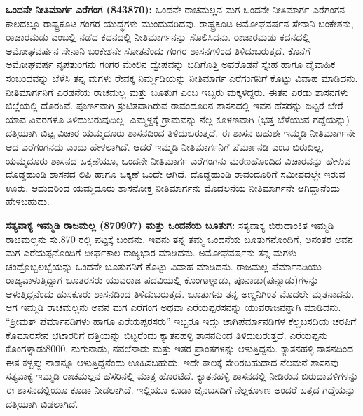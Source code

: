 \textbf{ಒಂದನೇ ನೀತಿಮಾರ್ಗ ಎರೆಗಂಗ (843870):} ಒಂದನೇ ರಾಚಮಲ್ಲನ ಮಗ ಒಂದನೇ ನೀತಿಮಾರ್ಗ ಎರೆಗಂಗನ ಕಾಲದಲ್ಲೂ ರಾಷ್ಟ್ರಕೂಟ ಗಂಗರ ಯುದ್ಧಗಳು ಮುಂದುವರಿದವು. ರಾಷ್ಟ್ರಕೂಟ ಅಮೋಘವರ್ಷನ ಸೇನಾನಿ ಬಂಕೇಶನು, ರಾಜಾರಮಡು ಎಂಬಲ್ಲಿ ನಡೆದ ಕದನದಲ್ಲಿ ನೀತಿಮಾರ್ಗನನ್ನು ಸೊಲಿಸಿದನು. ರಾಜಾರಮಡು ಕದನದಲ್ಲಿ ಅಮೋಘವರ್ಷನ ಸೇನಾನಿ ಬಂಕೇಶನೇ ಸೋತನೆಂದು ಗಂಗರ ಶಾಸನಗಳಿಂದ ತಿಳಿದುಬರುತ್ತದೆ. ಕೊನೆಗೆ ಅಮೋಘವರ್ಷ ನೃಪತುಂಗನು ಗಂಗರ ಮೇಲಿನ ದ್ವೇಷವನ್ನು ಬದಿಗೊತ್ತಿ ಅವರೊಡನೆ ಸ್ನೇಹ ಹಾಗೂ ವೈವಾಹಿಕ ಸಂಬಂಧವನ್ನು ಬೆಳೆಸಿ ತನ್ನ ಮಗಳು ರೇವಕ್ಕ ನಿರ್ಮ್ಮಡಿಯನ್ನು ನೀತಿಮಾರ್ಗ ಎರೆಗಂಗನಿಗೆ ಕೊಟ್ಟು ವಿವಾಹ ಮಾಡಿದನು. ನೀತಿಮಾರ್ಗನಿಗೆ ಎರಡನೆಯ ರಾಚಮಲ್ಲ ಮತ್ತು ಬೂತುಗ ಎಂಬ ಇಬ್ಬರು ಮಕ್ಕಳಿದ್ದರು. ಈತನ ಎರಡು ಶಾಸನಗಳು ಜಿಲ್ಲೆಯಲ್ಲಿ ದೊರಕಿವೆ. ಪೂರ್ಣವಾಗಿ ತ್ರುಟಿತವಾಗಿರುವ ರಾವಂದೂರಿನ ಶಾಸನದಲ್ಲಿ ಇವನ ಹೆಸರನ್ನು ಬಿಟ್ಟರೆ ಬೇರೆ ಯಾವ ವಿವರಗಳೂ ತಿಳಿದುಬರುವುದಿಲ್ಲ. ಎಮ್ಮಳ್ದಕ್ಕೆ ಗ್ರಾಮವನ್ನು ನೆಲ್ಲ ಕೂಳಣವಾಗಿ (ಭತ್ತ ಬೆಳೆಯುವ ಗದ್ದೆಯನ್ನು) ದತ್ತಿಯಾಗಿ ಬಿಟ್ಟ ವಿಚಾರ ಯಮ್ಮದೂರು ಶಾಸನದಿಂದ ತಿಳಿದುಬರುತ್ತದೆ.  ಈ ಶಾಸನ ಬಹುಶಃ ಇಮ್ಮಡಿ ನೀತಿಮಾರ್ಗನೇ ಆದ ಎರೆಗಂಗನದು ಎಂದು ಹೇಳಲಾಗಿದೆ. ಆದರೆ ಇಮ್ಮಡಿ ನೀತಿಮಾರ್ಗನಿಗೆ ಪೆರ್ಮಾನಡಿ ಎಂಬ ಬಿರುದಿಲ್ಲ. ಯಮ್ಮದೂರು ಶಾಸನದ ಒಕ್ಕಣೆಯೂ, ಒಂದನೇ ನೀತಿಮಾರ್ಗ ಎರೆಗಂಗನು ಮರಣಹೊಂದಿದ ವಿಚಾರವನ್ನು ಹೇಳುವ ದೊಡ್ಡಹುಂಡಿ ಶಾಸನದ ಲಿಪಿ ಹಾಗೂ ಒಕ್ಕಣೆ ಒಂದೇ ಆಗಿದೆ. ದೊಡ್ಡಹುಂಡಿ ರಾವಂದೂರಿಗೆ ಸಮೀಪದಲ್ಲೇ ಇರುವ ಊರು. ಆದುದರಿಂದ ಯಮ್ಮದೂರು ಶಾಸನೋಕ್ತ ನೀತಿಮಾರ್ಗನು ಮೊದಲನೆಯ ನೀತಿಮಾರ್ಗನೇ ಆಗಿದ್ದಾನೆಂದು ಹೇಳಬಹುದು. 

\textbf{ಸತ್ಯವಾಕ್ಯ ಇಮ್ಮಡಿ ರಾಜಮಲ್ಲ (870907) ಮತ್ತು ಒಂದನೆಯ ಬೂತುಗ: } ಸತ್ಯವಾಕ್ಯ ಬಿರುದಾಂಕಿತ ಇಮ್ಮಡಿ ರಾಚಮಲ್ಲನು ಸು.870 ರಲ್ಲಿ ಪಟ್ಟಕ್ಕೆ ಬಂದನು. ಇವನು ತನ್ನ ತಮ್ಮ ಒಂದನೆಯ ಬೂತುಗನೊಂದಿಗೆ, ಅನಂತರ ಅವನ ಮಗ ಎರೆಯಪ್ಪನೊಂದಿಗೆ ದೀರ್ಘಕಾಲ ರಾಜ್ಯಭಾರ ಮಾಡಿದನು. ಅಮೋಘವರ್ಷನು ತನ್ನ ಮಗಳು ಚಂದ್ರೊಬ್ಬಲಬ್ಬೆಯನ್ನು ಒಂದನೇ ಬೂತುಗನಿಗೆ ಕೊಟ್ಟು ವಿವಾಹ ಮಾಡಿದನು. ರಾಜಮಲ್ಲ ಪೆರ್ಮಾನಡಿಯು ರಾಜ್ಯವಾಳುತ್ತಿದ್ದಾಗ ಬೂತರಸರು ಯುವರಾಜ ಪದವಿಯಲ್ಲಿ ಕೊಂಗಾಳ್ನಾಡು, ಪೂನಾಡು(ಪುನ್ನಾಡು)ಗಳನ್ನು ಆಳುತ್ತಿದ್ದನೆಂದು ಹುಸಕೂರು ಶಾಸನದಿಂದ ತಿಳಿದುಬರುತ್ತದೆ. ಬೂತುಗನು ತನ್ನ ಅಣ್ಣನಿಗಿಂತ ಮೊದಲೇ ಮೃತನಾದನು. ಆಗ ಇಮ್ಮಡಿ ರಾಚಮಲ್ಲನು ಅವನ ಮಗ ಎರೆಗಂಗ ಅಥವಾ ಎರೆಯಪ್ಪರಸನನ್ನು ಯುವರಾಜನನ್ನಾಗಿ ಮಾಡಿದನು. “ಶ‍್ರೀಮತ್​ ಪೆರ್ಮಾನಡಿಗಳು ಹಾಗೂ ಎರೆಯಪ್ಪರಸರು” ಇಬ್ಬರೂ ಇದ್ದು ಚಾಗಿಪೆರ್ಮಾನಡಿಗಳ ಕೆಲ್ಲಬಸದಿಯ ಚರಪಿಗೆ ಕೊಮಾರಸೇನ ಭಟಾರರಿಗೆ ದತ್ತಿಯನ್ನು ಬಿಟ್ಟರೆಂದು ಕ್ಯಾತನಹಳ್ಳಿ ಶಾಸನದಿಂದ ತಿಳಿದುಬರುತ್ತದೆ. ಎರೆಯಪ್ಪನು ಕೊಂಗಳ್ನಾಡು8000, ನುಗುನಾಡು, ನವಲೆನಾಡು ಮತ್ತು ಇತರ ಪ್ರಾಂತಗಳನ್ನು ಆಳುತ್ತಿದ್ದನು. ಕ್ಯಾತನಹಳ್ಳಿ ಶಾಸನದಿಂದ ಈತ ಕಳ್ಬಪ್ಪು ನಾಡನ್ನೂ ಆಳುತ್ತಿದ್ದನೆಂದು ಊಹಿಸಬಹುದು. ಇದೇ ಕಾಲಕ್ಕೆ ಸೇರಿರಬಹುದಾದ ನೆಲಮನೆ ಶಾಸನವು ಸತ್ಯವಾಕ್ಯ ಇಮ್ಮಡಿ ರಾಚಮಲ್ಲನ ಹೆಸರಿನಲ್ಲಿ ಮಾತ್ರ ಹೊರಟಿದೆ. ಕ್ಯಾತನಹಳ್ಳಿ ಶಾಸನದಲ್ಲಿ ನೀಡಿರುವ ಬಿರುದಾವಳಿಗಳನ್ನು ಈ ಶಾಸನದಲ್ಲಿಯೂ ಕೂಡಾ ನೀಡಲಾಗಿದೆ. ಇಲ್ಲಿಯೂ ಕೂಡಾ ಜೈನಬಸದಿಗೆ ನೆಲ್ಲಕೂಳಣ ಅಂದರೆ ಬತ್ತದ ಗದ್ದೆಯನ್ನು ದತ್ತಿಯಾಗಿ ಬಿಡಲಾಗಿದೆ.

